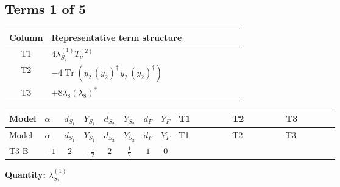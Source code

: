 \documentclass[8pt]{article}
\begin{document}
\begin{landscape}
\subsection*{Terms 1 of 5}
\begin{center}
\begin{tabular}{@{}c >{\raggedright\arraybackslash}p{0.82\linewidth}@{}}
\toprule
Column & Representative term structure \\
\midrule
T1 & \(\displaystyle 4 {\lambda_{S_2}^{(1)}} T_{\nu}^{(2)}\) \\
\midrule
T2 & \(\displaystyle -4 \operatorname{Tr}\!\left({y_2}\,\left({y_2}\right)^{\dagger}\,{y_2}\,\left({y_2}\right)^{\dagger}\right)\) \\
\midrule
T3 & \(\displaystyle +8 {\lambda_{8}} \left({\lambda_{8}}\right)^{*}\) \\
\midrule
\bottomrule
\end{tabular}
\end{center}
\smallskip
\tiny
\begin{longtable}{@{}llcccccc >{\raggedright\arraybackslash}p{0.21\linewidth} >{\raggedright\arraybackslash}p{0.21\linewidth} >{\raggedright\arraybackslash}p{0.21\linewidth}@{}}
\toprule
Model & $\alpha$ & $d_{S_1}$ & $Y_{S_1}$ & $d_{S_2}$ & $Y_{S_2}$ & $d_F$ & $Y_F$ & T1 & T2 & T3 \\
\midrule
\endfirsthead
\toprule
Model & $\alpha$ & $d_{S_1}$ & $Y_{S_1}$ & $d_{S_2}$ & $Y_{S_2}$ & $d_F$ & $Y_F$ & T1 & T2 & T3 \\
\midrule
\endhead
T3-B & $-1$ & $2$ & $-\frac{1}{2}$ & $2$ & $\frac{1}{2}$ & $1$ & $0$ & \scriptsize\adjustbox{max width=\linewidth}{$\begin{gathered} 4 {\lambda_{S_2}^{(1)}} T_{\nu}^{(2)}\end{gathered}$} & \scriptsize\adjustbox{max width=\linewidth}{$\begin{gathered} -4 \operatorname{Tr}\!\left({y_2}\,\left({y_2}\right)^{\dagger}\,{y_2}\,\left({y_2}\right)^{\dagger}\right)\end{gathered}$} & \scriptsize\adjustbox{max width=\linewidth}{$\begin{gathered} +8 {\lambda_{8}} \left({\lambda_{8}}\right)^{*}\end{gathered}$} \\
\midrule
\bottomrule
\end{longtable}
\clearpage
\noindent\textbf{Quantity: }$\lambda_{S_2}^{(1)}$\par\smallskip

\end{landscape}
\end{document}
